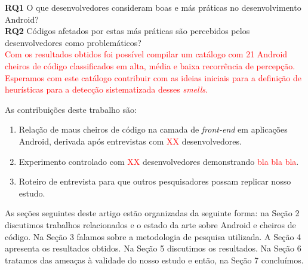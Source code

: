 \textbf{RQ1} O que desenvolvedores consideram boas e más práticas no desenvolvimento Android? \\

\textbf{RQ2} Códigos afetados por estas más práticas são percebidos pelos desenvolvedores como problemáticos? \\

 \textcolor{red}{Com os resultados obtidos foi possível compilar um catálogo com 21 Android cheiros de código classificados em alta, média e baixa recorrência de percepção. Esperamos com este catálogo contribuir com as ideias iniciais para a definição de heurísticas para a detecção sistematizada desses \textit{smells}.}

As contribuições deste trabalho são:

\begin{enumerate}

	\item Relação de maus cheiros de código na camada
	de \textit{front-end} em aplicações Android, derivada após
	entrevistas com \textcolor{red}{XX} desenvolvedores.

	\item Experimento controlado com \textcolor{red}{XX} 
	desenvolvedores demonstrando \textcolor{red}{bla bla bla}.

	\item Roteiro de entrevista para que outros pesquisadores
	possam replicar nosso estudo.
\end{enumerate}

As seções seguintes deste artigo estão organizadas da seguinte forma: na Seção 2 discutimos trabalhos relacionados e o estado da arte sobre Android e cheiros de código. Na Seção 3 falamos sobre a metodologia de pesquisa utilizada. A Seção 4 apresenta os resultados obtidos. Na Seção 5 discutimos os resultados. Na Seção 6 tratamos das ameaças à validade do nosso estudo e então, na Seção 7 concluímos.
